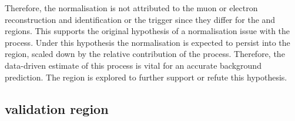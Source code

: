 %
Therefore, the normalisation is not attributed to the muon or electron reconstruction and identification or the trigger since they differ for the \muplusjets and \eleplusjets regions. This supports the original hypothesis of a normalisation issue with the \IWj process. Under this hypothesis the normalisation is expected to persist into the \metplusjets region, scaled down by the relative contribution of the \IWj process. Therefore, the data-driven estimate of this process is vital for an accurate background prediction. The \tauplusjets region is explored to further support or refute this hypothesis.


\subsection{\tauplusjets validation region}

